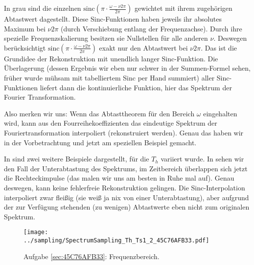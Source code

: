 \begin{Loesung}
In grau sind die einzelnen $\mathrm{sinc}(\pi\cdot\frac{\omega-\nu 2 \pi}{2\pi})$
gewichtet mit ihrem zugehörigen Abtastwert dagestellt.
Diese Sinc-Funktionen haben jeweils ihr absolutes Maximum bei $\nu 2 \pi$ (durch
Verschiebung entlang der Frequenzachse). Durch ihre spezielle Frequenzskalierung
besitzen sie Nullstellen für alle anderen $\nu$. Deswegen
berücksichtigt $\mathrm{sinc}(\pi\cdot\frac{\omega-\nu 2 \pi}{2\pi})$
exakt nur den Abtastwert bei $\nu 2 \pi$. Das ist die Grundidee der Rekonstruktion
mit unendlich langer Sinc-Funktion. Die Überlagerung (dessen Ergebnis wir eben nur schwer
in der Summen-Formel sehen, früher wurde mühsam mit tabelliertem Sinc per Hand summiert)
aller Sinc-Funktionen liefert dann die kontinuierliche Funktion,
hier das Spektrum der Fourier Transformation.

Also merken wir uns: Wenn das Abtasttheorem für den Bereich $\omega$ eingehalten wird,
kann aus den Fourreihekoeffizienten das eindeutige Spektrum der Fouriertransformation
interpoliert (rekonstruiert werden). Genau das haben wir in der Vorbetrachtung und
jetzt am speziellen Beispiel gemacht.

%
In  sind zwei weitere Beispiele
dargestellt, für die $T_h$ variiert wurde.
In  sehen wir den Fall der
Unterabtastung des Spektrums, im Zeitbereich überlappen sich jetzt die
Rechteckimpulse (das malen wir uns am besten in Ruhe mal auf).
Genau deswegen, kann keine fehlerfreie Rekonstruktion gelingen. Die Sinc-Interpolation
interpoliert zwar fleißig (sie weiß ja nix von einer Unterabtastung), aber aufgrund
der zur Verfügung stehenden (zu wenigen) Abtastwerte eben nicht zum originalen Spektrum.
\end{Loesung}


\begin{figure}
\centering
\texttt{[image: ../sampling/SpectrumSampling\_Th\_Ts1\_2\_45C76AFB33.pdf]}
\caption{Aufgabe \ref{sec:45C76AFB33}: Frequenzbereich.}
\label{fig:SpectrumSampling_Th_Ts1_2_45C76AFB33}
\end{figure}



